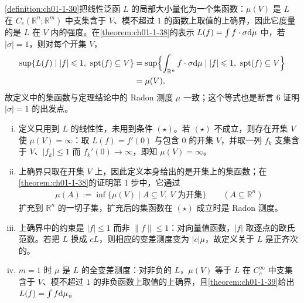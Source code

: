 \documentclass[../../main.tex]{subfiles}%
\begin{document}
\begin{remark}\label{remark:ch01-def-1-30-动机}
\cref{definition:ch01-1-30}把线性泛函 $L$ 的局部大小量化为一个集函数：$\mu(V)$ 是 $L$ 在 $C_c(\mathbb{R}^n;\mathbb{R}^m)$ 中支集含于 $V$、模不超过 $1$ 的函数上取值的上确界，因此它度量的是 $L$ 在 $V$ 内的强度。在\cref{theorem:ch01-1-38}的表示 $L(f)=\int f\cdot\sigma\mathrm{d}\mu$ 中，若 $\lvert\sigma\rvert=1$，则对每个开集 $V$，%
\begin{align*}
\sup\{L(f)\mid\lvert f\rvert\leqslant1,\ \operatorname{spt}(f)\subseteq V\}
&=\sup\Bigl\{\int_{\mathbb{R}^n}f\cdot\sigma\mathrm{d}\mu\mid\lvert f\rvert\leqslant1,\ \operatorname{spt}(f)\subseteq V\Bigr\}\\
&=\mu(V),
\end{align*}
故定义中的集函数与定理结论中的 Radon 测度 $\mu$ 一致；这个等式也是断言 6 证明 $\lvert\sigma\rvert=1$ 的出发点。
\end{remark}

\begin{remark}\label{remark:ch01-def-1-30-条件}
\begin{enumerate}[(i)]
\item 定义只用到 $L$ 的线性性，未用到条件 $(\star)$。若 $(\star)$ 不成立，则存在开集 $V$ 使 $\mu(V)=\infty$：取 $L(f)=f'(0)$ 与包含 $0$ 的开集 $V$，并取一列 $f_k$ 支集含于 $V$、$\lvert f_k\rvert\leqslant1$ 而 $f_k'(0)\to\infty$，即知 $\mu(V)=\infty$。
\item 上确界只取在开集 $V$ 上，因此定义本身给出的是开集上的集函数；在\cref{theorem:ch01-1-38}的证明第 1 步中，它通过%
\begin{align*}
\mu(A):=\inf\{\mu(V)\mid A\subseteq V,\ V\text{ 为开集}\}\qquad(A\subseteq\mathbb{R}^n)
\end{align*}
扩充到 $\mathbb{R}^n$ 的一切子集，扩充后的集函数在 $(\star)$ 成立时是 Radon 测度。
\item 上确界中的约束是 $\lvert f\rvert\leqslant1$ 而非 $\lVert f\rVert\leqslant1$：对向量值函数，$\lvert f\rvert$ 取逐点的欧氏范数。若把 $L$ 换成 $cL$，则相应的变差测度变为 $\lvert c\rvert\mu$，故定义关于 $L$ 是正齐次的。
\item $m=1$ 时 $\mu$ 是 $L$ 的全变差测度：对非负的 $L$，$\mu(V)$ 等于 $L$ 在 $C_c^{\infty}$ 中支集含于 $V$、模不超过 $1$ 的非负函数上取值的上确界，且\cref{theorem:ch01-1-39}给出 $L(f)=\int f\mathrm{d}\mu$。%
\end{enumerate}
\end{remark}
\end{document}
